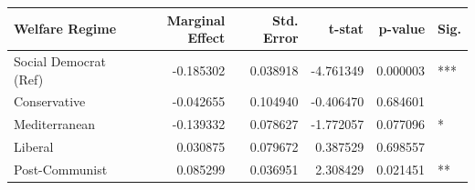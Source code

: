 \begin{tabular}{lrrrrl}
\toprule
Welfare Regime & Marginal Effect & Std. Error & t-stat & p-value & Sig. \\
\midrule
Social Democrat (Ref) & -0.185302 & 0.038918 & -4.761349 & 0.000003 & *** \\
Conservative & -0.042655 & 0.104940 & -0.406470 & 0.684601 &  \\
Mediterranean & -0.139332 & 0.078627 & -1.772057 & 0.077096 & * \\
Liberal & 0.030875 & 0.079672 & 0.387529 & 0.698557 &  \\
Post-Communist & 0.085299 & 0.036951 & 2.308429 & 0.021451 & ** \\
\bottomrule
\end{tabular}
